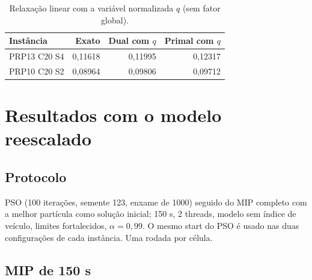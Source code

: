 \documentclass[11pt,a4paper]{article}
\begin{document}
\begin{table}[h]
  \centering
  \begin{tabular}{lrrr}
    \toprule
    Instância & Exato & Dual com $q$ & Primal com $q$\\
    \midrule
    PRP13 C20 S4 & 0{,}11618 & 0{,}11995 & 0{,}12317\\
    PRP10 C20 S2 & 0{,}08964 & 0{,}09806 & 0{,}09712\\
    \bottomrule
  \end{tabular}
  \caption{Relaxação linear com a variável normalizada $q$ (sem fator global).}
\end{table}

\section{Resultados com o modelo reescalado}

\subsection{Protocolo}

PSO (100 iterações, semente 123, enxame de 1000) seguido do MIP completo com a
melhor partícula como solução inicial; 150 s, 2 threads, modelo sem índice de
veículo, limites fortalecidos, $\alpha=0{,}99$. O mesmo start do PSO é usado
nas duas configurações de cada instância. Uma rodada por célula.

\subsection{MIP de 150 s}
\end{document}
